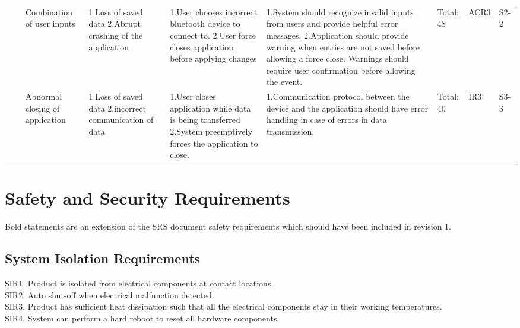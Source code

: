 \documentclass{article}
\begin{document}
\begin{table}[H]
\begin{tabular}{| p{} | p{}  | p{} | p{} | p{} | p{} | p{} | p{} | p{} |}
     & & Combination of user inputs & 1.Loss of saved data \newline 2.Abrupt crashing of the application  &  1.User chooses incorrect bluetooth device to connect to. \newline 2.User force closes application before applying changes  &  1.System should recognize invalid inputs from users and provide helpful error messages. \newline 2.Application should provide warning when entries are not saved before allowing a force close. Warnings should require user confirmation before allowing the event.  & Total: 48 & ACR3 & S2-2 \\ \cline{3-9}

     & & Abnormal closing of application & 1.Loss of saved data \newline 2.incorrect communication of data  & 1.User closes application while data is being transferred \newline 2.System preemptively forces the application to close. & 1.Communication protocol between the device and the application should have error handling in case of errors in data transmission.  & Total: 40 & IR3 & S3-3 \\ \hline
    
    \end{tabular}
    \hspace*{-1cm}
    \end{table}

\newpage 
\section{Safety and Security Requirements}

Bold statements are an extension of the SRS document safety requirements which should have been included in revision 1.

\subsection{System Isolation Requirements}

SIR1. Product is isolated from electrical components at contact locations.
\\SIR2. Auto shut-off when electrical malfunction detected.
\\SIR3. Product has sufficient heat dissipation such that all the electrical components stay in their working temperatures.
\\SIR4. System can perform a hard reboot to reset all hardware components.
\end{document}
